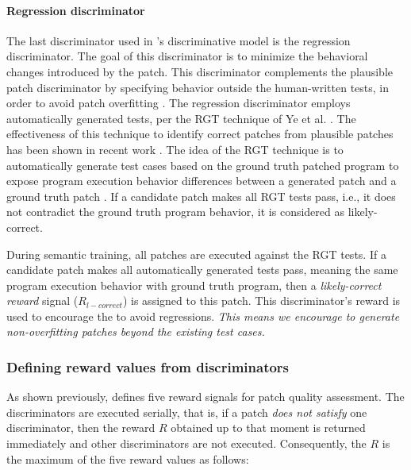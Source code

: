 \paragraph{Regression discriminator}
\label{sec:behavior_discriminator}
The last discriminator used in  \approach's discriminative model is the regression discriminator.
The goal of this discriminator is to minimize the behavioral changes introduced by the patch.
This discriminator complements the plausible patch discriminator by specifying behavior outside the human-written tests, in order to avoid patch overfitting \cite{zhongxing-EMSE18,Le:overfitting,le:reliability-patch-assess,CURE-worse-15}.
The \approach regression discriminator employs automatically generated tests, per the RGT technique of Ye et al. \cite{drr}.  The effectiveness of this technique to identify correct patches from plausible patches has been shown in recent work \cite{ASE20Wang,ODS,quixbugs-jss}.
The idea of the RGT technique is to automatically generate test cases based on the ground truth patched program to expose program execution behavior differences between a generated patch and a ground truth patch \cite{le:reliability-patch-assess,ASE20Wang,drr}. 
If a candidate patch makes all RGT tests pass, i.e., it does not contradict the ground truth program behavior, it is considered as likely-correct.

During semantic training, all patches are executed against the RGT tests.
If a candidate patch makes all automatically generated tests pass, meaning the same program execution behavior with ground truth program,  then  a \textit{likely-correct reward} signal ($R_{l-correct}$) is assigned to this patch. 
This discriminator's reward is used to encourage the \approach to avoid regressions.
\emph{This means we encourage \approach to generate non-overfitting patches beyond the existing test cases.}

\subsubsection{Defining reward values from discriminators}
\label{sec:reward-value}

As shown previously, \approach defines five reward signals for patch quality assessment.
The discriminators are executed serially, that is, if a patch \emph{does not satisfy} one discriminator, then the reward $R$ obtained up to that moment is returned immediately and other discriminators are not executed. 
Consequently, the $R$ is the maximum  of the five reward values as follows:


